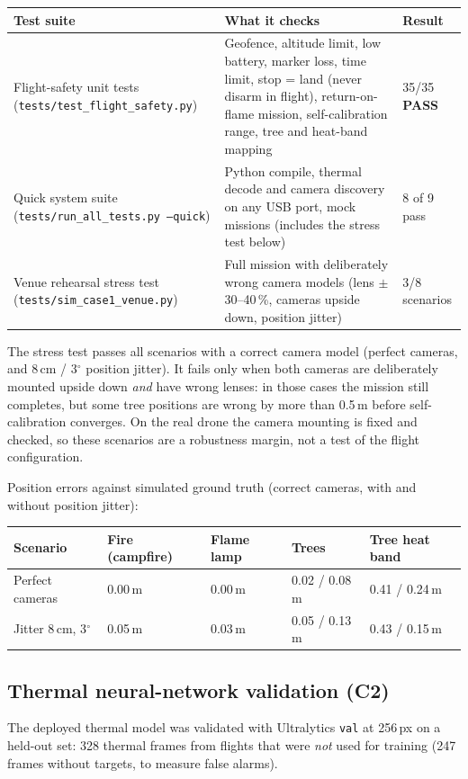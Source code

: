 \documentclass[10pt,a4paper]{article}
\newcommand{\PASS}{\textcolor{passgreen}{\textbf{\ding{51}\,PASS}}}
\newcommand{\head}[1]{\textbf{#1}}
\newcommand{\file}[1]{\texttt{\small #1}}
\begin{document}
\begin{tabularx}{\textwidth}{|L{5.2cm}|Y|L{2.1cm}|}
\hline
{}\head{Test suite} & \head{What it checks} & \head{Result} \\ \hline
Flight-safety unit tests (\file{tests/test\_flight\_safety.py}) & Geofence, altitude limit, low battery, marker loss, time limit, stop = land (never disarm in flight), return-on-flame mission, self-calibration range, tree and heat-band mapping & 35/35 \PASS \\ \hline
Quick system suite (\file{tests/run\_all\_tests.py --quick}) & Python compile, thermal decode and camera discovery on any USB port, mock missions (includes the stress test below) & 8 of 9 pass \\ \hline
Venue rehearsal stress test (\file{tests/sim\_case1\_venue.py}) & Full mission with deliberately wrong camera models (lens $\pm$30--40\,\%, cameras upside down, position jitter) & 3/8 scenarios \\ \hline
\end{tabularx}

The stress test passes all scenarios with a correct camera model (perfect cameras, and 8\,cm / 3$^\circ$ position jitter).
It fails only when both cameras are deliberately mounted upside down \emph{and} have wrong lenses: in those cases the
mission still completes, but some tree positions are wrong by more than 0.5\,m before self-calibration converges. On the
real drone the camera mounting is fixed and checked, so these scenarios are a robustness margin, not a test of the flight
configuration.

Position errors against simulated ground truth (correct cameras, with and without position jitter):

\begin{tabularx}{\textwidth}{|L{3.4cm}|Y|Y|Y|Y|}
\hline
{}\head{Scenario} & \head{Fire (campfire)} & \head{Flame lamp} & \head{Trees} & \head{Tree heat band} \\ \hline
Perfect cameras & 0.00\,m & 0.00\,m & 0.02 / 0.08\,m & 0.41 / 0.24\,m \\ \hline
Jitter 8\,cm, 3$^\circ$ & 0.05\,m & 0.03\,m & 0.05 / 0.13\,m & 0.43 / 0.15\,m \\ \hline
\end{tabularx}

\subsection{Thermal neural-network validation (C2)}
The deployed thermal model was validated with Ultralytics \texttt{val} at 256\,px on a held-out set: 328 thermal frames
from flights that were \emph{not} used for training (247 frames without targets, to measure false alarms).
\end{document}
